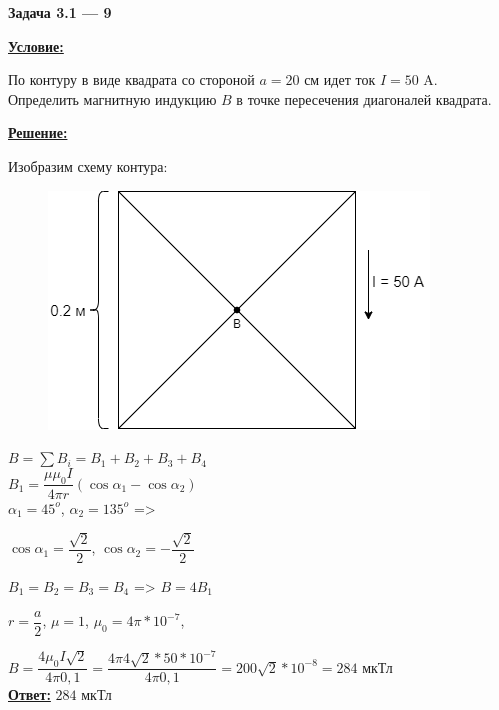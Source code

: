 
\begin{center}
    \textbf{Задача 3.1 --- 9}
\end{center}

\underline{\textbf{Условие:}}

По контуру в виде квадрата со стороной $ a = 20 $ см идет ток $ I = 50 $ A. Определить магнитную индукцию $ B $ в точке пересечения диагоналей квадрата.

\underline{\textbf{Решение:}}

Изобразим схему контура:

\begin{figure}[hpt!]
    \centering
    \includegraphics[width=0.8\linewidth]{photo/3-1-9}
\end{figure}

$ B = \sum{B_i} = B_1 + B_2 + B_3 + B_4 $\\

$ 
B_1 = 
\dfrac
{\mu \mu_0 I}
{4 \pi r} 
(\cos{\alpha_1} - \cos{\alpha_2}) 
$\\

$ \alpha_1 = 45^o $, 
$ \alpha_2 = 135^o $ => 

$ \cos{\alpha_1} = \dfrac{\sqrt{2}}{2} $,
$ \cos{\alpha_2} = -\dfrac{\sqrt{2}}{2} $

$ B_1 = B_2 = B_3 = B_4 $ => $ B = 4B_1 $

$ r = \dfrac{a}{2} $, 
$ \mu = 1 $, 
$ \mu_0 = 4\pi * 10^{-7} $, 

$ B = 
\dfrac{4\mu_0I\sqrt{2}}{4\pi 0,1} = 
\dfrac{4\pi 4 \sqrt{2} * 50 * 10^{-7}}{4\pi 0,1} =
200 \sqrt{2} * 10^{-8} = 
284 $ мкТл
\\

\underline{\textbf{Ответ:}}
$ 284 $ мкТл
